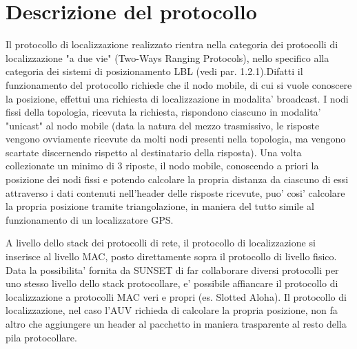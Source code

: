 \documentclass[Lau,binding=0.6cm]{sapthesis}
\begin{document}
\section{Descrizione del protocollo}
Il protocollo di localizzazione realizzato rientra nella categoria dei protocolli di localizzazione "a due vie" (Two-Ways Ranging Protocols), nello specifico alla categoria dei sistemi di posizionamento LBL (vedi par. 1.2.1).\newline Difatti il funzionamento del protocollo richiede che il nodo mobile, di cui si vuole conoscere la posizione, effettui una richiesta di localizzazione in modalita' broadcast. I nodi fissi della topologia, ricevuta la richiesta, rispondono ciascuno in modalita' "unicast" al nodo mobile (data la natura del mezzo trasmissivo, le risposte vengono ovviamente ricevute da molti nodi presenti nella topologia, ma vengono scartate discernendo rispetto al destinatario della risposta).  Una volta collezionate un minimo di 3 riposte, il nodo mobile, conoscendo a priori la posizione dei nodi fissi e potendo calcolare la propria distanza da ciascuno di essi attraverso i dati contenuti nell'header delle risposte ricevute, puo' cosi' calcolare la propria posizione tramite triangolazione, in maniera del tutto simile al funzionamento di un localizzatore GPS.

A livello dello stack dei protocolli di rete, il protocollo di localizzazione si inserisce al livello MAC, posto direttamente sopra il protocollo di livello fisico. Data la possibilita' fornita da SUNSET di far collaborare diversi protocolli per uno stesso livello dello stack protocollare, e' possibile affiancare il protocollo di localizzazione a protocolli MAC veri e propri (es. Slotted Aloha). Il protocollo di localizzazione, nel caso l'AUV richieda di calcolare la propria posizione, non fa altro che aggiungere un header al pacchetto in maniera trasparente al resto della pila protocollare.
\end{document}
